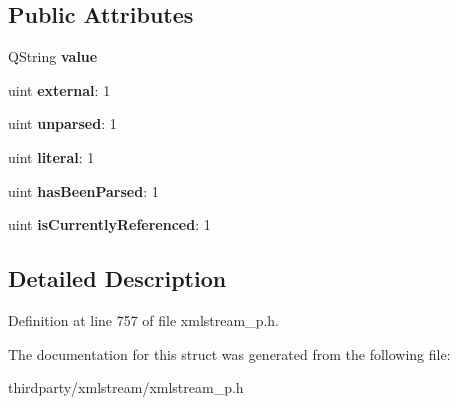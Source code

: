 \subsection*{Public Attributes}
\begin{DoxyCompactItemize}
\item 
\mbox{\label{struct_xml_stream_reader_private_1_1_entity_ad61e5d7100436d28d52c3902f90617ff}} 
Q\+String {\bfseries value}
\item 
\mbox{\label{struct_xml_stream_reader_private_1_1_entity_a64ca7216d871dfc1764175bd1a3da1bd}} 
uint {\bfseries external}\+: 1
\item 
\mbox{\label{struct_xml_stream_reader_private_1_1_entity_a03fd8049b2efdf34982043cec52c1b6a}} 
uint {\bfseries unparsed}\+: 1
\item 
\mbox{\label{struct_xml_stream_reader_private_1_1_entity_a10918da8d6f12bd6f73396b31420d9c2}} 
uint {\bfseries literal}\+: 1
\item 
\mbox{\label{struct_xml_stream_reader_private_1_1_entity_afd896fff001f5a1f9e6ceb2b6151d3d3}} 
uint {\bfseries has\+Been\+Parsed}\+: 1
\item 
\mbox{\label{struct_xml_stream_reader_private_1_1_entity_a9c13584a3980e761c217623ff5f8004a}} 
uint {\bfseries is\+Currently\+Referenced}\+: 1
\end{DoxyCompactItemize}


\subsection{Detailed Description}


Definition at line 757 of file xmlstream\+\_\+p.\+h.



The documentation for this struct was generated from the following file\+:\begin{DoxyCompactItemize}
\item 
thirdparty/xmlstream/xmlstream\+\_\+p.\+h\end{DoxyCompactItemize}

